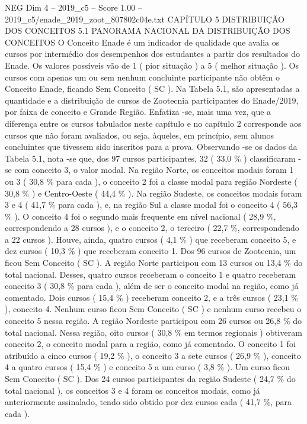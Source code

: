 \begin{textsample}{NEG Dim 4 – 2019\_c5 – Score 1.00 – 2019\_c5/enade\_2019\_zoot\_807802c04e.txt}  \label{ex:f4_neg_161}
CAPÍTULO 5 DISTRIBUIÇÃO DOS CONCEITOS 5.1 PANORAMA NACIONAL DA DISTRIBUIÇÃO DOS CONCEITOS O Conceito Enade é um indicador de qualidade que avalia os cursos por intermédio dos desempenhos dos estudantes a partir dos resultados do Enade.
Os valores possíveis vão de 1 ( pior situação ) a 5 ( melhor situação ).
Os cursos com apenas um ou sem nenhum concluinte participante não obtêm o Conceito Enade, ficando Sem Conceito ( SC ).
Na Tabela 5.1, são apresentadas a quantidade e a distribuição de cursos de Zootecnia participantes do Enade/2019, por faixa de conceito e Grande Região.
Enfatiza -se, mais uma vez, que a diferença entre os cursos tabulados neste capítulo e no capítulo 2 corresponde aos cursos que não foram avaliados, ou seja, àqueles, em princípio, sem alunos concluintes que tivessem sido inscritos para a prova.
Observando -se os dados da Tabela 5.1, nota -se que, dos 97 cursos participantes, 32 ( 33,0 \% ) classificaram -se com conceito 3, o valor modal.
Na região Norte, os conceitos modais foram 1 ou 3 ( 30,8 \% para cada ), o conceito 2 foi a classe modal para região Nordeste ( 30,8 \% ) e Centro-Oeste ( 44,4 \% ).
Na região Sudeste, os conceitos modais foram 3 e 4 ( 41,7 \% para cada ), e, na região Sul a classe modal foi o conceito 4 ( 56,3 \% ).
O conceito 4 foi o segundo mais frequente em nível nacional ( 28,9 \%, correspondendo a 28 cursos ), e o conceito 2, o terceiro ( 22,7 \%, correspondendo a 22 cursos ).
Houve, ainda, quatro cursos ( 4,1 \% ) que receberam conceito 5, e dez cursos ( 10,3 \% ) que receberam conceito 1.
Dos 96 cursos de Zootecnia, um ficou Sem Conceito ( SC ).
A região Norte participou com 13 cursos ou 13,4 \% do total nacional.
Desses, quatro cursos receberam o conceito 1 e quatro receberam conceito 3 ( 30,8 \% para cada ), além de ser o conceito modal na região, como já comentado.
Dois cursos ( 15,4 \% ) receberam conceito 2, e a três cursos ( 23,1 \% ), conceito 4.
Nenhum curso ficou Sem Conceito ( SC ) e nenhum curso recebeu o conceito 5 nessa região.
A região Nordeste participou com 26 cursos ou 26,8 \% do total nacional.
Nessa região, oito cursos ( 30,8 \% em termos regionais ) obtiveram conceito 2, o conceito modal para a região, como já comentado.
O conceito 1 foi atribuído a cinco cursos ( 19,2 \% ), o conceito 3 a sete cursos ( 26,9 \% ), conceito 4 a quatro cursos ( 15,4 \% ) e conceito 5 a um curso ( 3,8 \% ).
Um curso ficou Sem Conceito ( SC ).
Dos 24 cursos participantes da região Sudeste ( 24,7 \% do total nacional ), os conceitos 3 e 4 foram os conceitos modais, como já anteriormente assinalado, tendo sido obtido por dez cursos cada ( 41,7 \%, para cada ).

\end{textsample}
